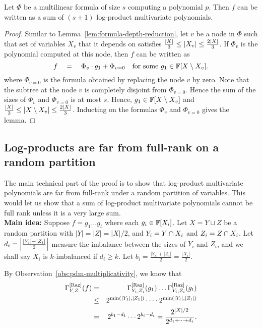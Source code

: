 \begin{lemma}\label{lem:mult-logproduct}
  Let $\Phi$ be a multilinear formula of size $s$ computing a polynomial $p$. Then $f$ can be written as a sum of $(s+1)$ log-product multivariate polynomials.
\end{lemma}
\begin{proof}
  Similar to Lemma~\ref{lem:formula-depth-reduction}, let $v$ be a node in $\Phi$ such that set of variables $X_v$ that it depends on satisfies $\frac{|X|}{3} \leq \left|X_v\right| \leq \frac{2|X|}{3}$. If $\Phi_v$ is the polynomial computed at this node, then $f$ can be written as
  $$
  f \quad = \quad \Phi_v \cdot g_1 + \Phi_{v=0} \quad\text{for some $g_1 \in \mathbb{F}[X\setminus X_v]$}.
  $$
  where $\Phi_{v=0}$ is the formula obtained by replacing the node $v$ by zero. Note that the subtree at the node $v$ is completely disjoint from $\Phi_{v=0}$. Hence the sum of the sizes of $\Phi_v$ and $\Phi_{v=0}$ is at most $s$. Hence, $g_1 \in \mathbb{F}[X\setminus X_v]$ and $\frac{|X|}{3} \leq \left|X \setminus X_v\right| \leq \frac{2|X|}{3}$. Inducting on the formulas $\Phi_v$ and $\Phi_{v=0}$ gives the lemma.
\end{proof}

\subsection{Log-products are far from full-rank on a random
  partition}

The main technical part of the proof is to show that log-product multivariate polynomials are far from full-rank under a random partition of variables. This would let us show that a sum of log-product multivariate polynomials cannot be full rank unless it is a very large sum.\\

{\bf Main idea: } Suppose $f = g_1 \dots g_t$ where each $g_i \in \mathbb{F}[X_i]$. Let $X = Y \sqcup Z$ be a random partition with $|Y| = |Z| = |X|/2$, and $Y_i = Y \cap X_i$ and $Z_i = Z \cap X_i$. Let $d_i = \left|\frac{|Y_i| - |Z_i|}{2}\right|$ measure the imbalance between the sizes of $Y_i$ and $Z_i$, and we shall say $X_i$ is $k$-imbalanced if $d_i \geq k$. Let $b_i = \frac{|Y_i| + |Z_i|}{2} = \frac{|X_i|}{2}$.

By Observation~\ref{obs:pdm-multiplicativity}, we know that 
\begin{eqnarray*}
\Gamma^{\mathrm{[Raz]}}_{Y,Z}(f) & = & \Gamma^{\mathrm{[Raz]}}_{Y_i,Z_i}(g_1) \dots \Gamma^{\mathrm{[Raz]}}_{Y_i,Z_i}(g_t)\\
 & \leq & 2^{\min(|Y_1|,|Z_1|)} \cdots  \cdot 2^{\min(|Y_t|,|Z_t|)}\\ 
 & = & 2^{b_1  - d_1} \cdots 2^{b_t - d_t} = \frac{2^{|X|/2}}{2^{d_1 + \dots + d_t}}.
\end{eqnarray*}

